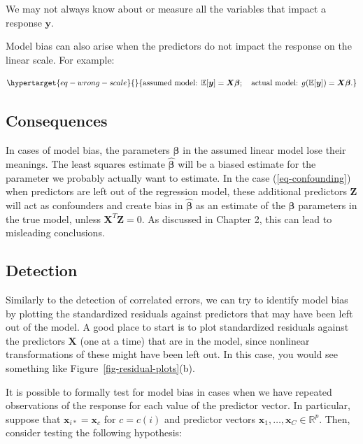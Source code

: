 \documentclass[
  11pt,
  letterpaper,
  oneside]{book}
\theoremstyle{definition}
\theoremstyle{plain}
\theoremstyle{plain}
\theoremstyle{plain}
\theoremstyle{remark}
\begin{document}
We may not always know about or measure all the variables that impact a
response \(\boldsymbol{y}\).

Model bias can also arise when the predictors do not impact the response
on the linear scale. For example:

\begin{equation}\protect\hypertarget{eq-wrong-scale}{}{
\text{assumed model: } \mathbb{E}[\boldsymbol{y}] = \boldsymbol{X} \boldsymbol{\beta}; \quad \text{actual model: } g(\mathbb{E}[\boldsymbol{y}]) = \boldsymbol{X} \boldsymbol{\beta}.
}\label{eq-wrong-scale}\end{equation}

\hypertarget{consequences-2}{%
\subsection{Consequences}\label{consequences-2}}

In cases of model bias, the parameters \(\boldsymbol{\beta}\) in the
assumed linear model lose their meanings. The least squares estimate
\(\boldsymbol{\widehat{\beta}}\) will be a biased estimate for the
parameter we probably actually want to estimate. In the case
(\ref{eq-confounding}) when predictors are left out of the regression
model, these additional predictors \(\boldsymbol{Z}\) will act as
confounders and create bias in \(\boldsymbol{\widehat{\beta}}\) as an
estimate of the \(\boldsymbol{\beta}\) parameters in the true model,
unless \(\boldsymbol{X}^T \boldsymbol{Z} = 0\). As discussed in Chapter
2, this can lead to misleading conclusions.

\hypertarget{detection-2}{%
\subsection{Detection}\label{detection-2}}

Similarly to the detection of correlated errors, we can try to identify
model bias by plotting the standardized residuals against predictors
that may have been left out of the model. A good place to start is to
plot standardized residuals against the predictors \(\boldsymbol{X}\)
(one at a time) that are in the model, since nonlinear transformations
of these might have been left out. In this case, you would see something
like Figure~\ref{fig-residual-plots}(b).

It is possible to formally test for model bias in cases when we have
repeated observations of the response for each value of the predictor
vector. In particular, suppose that
\(\boldsymbol{x}_{i*} = \boldsymbol{x}_c\) for \(c = c(i)\) and
predictor vectors
\(\boldsymbol{x}_1, \dots, \boldsymbol{x}_C \in \mathbb{R}^p\). Then,
consider testing the following hypothesis:
\end{document}
